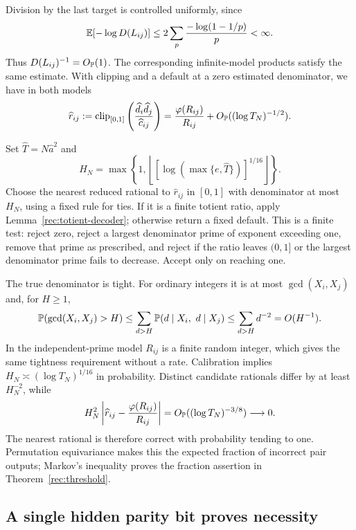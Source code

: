 Division by the last target is controlled uniformly, since
\begin{equation}\label{rec:codegree-tight}
 \mathbb E[-\log D(L_{ij})]
 \le2\sum_p\frac{-\log(1-1/p)}p<\infty.
\end{equation}
Thus $D(L_{ij})^{-1}=O_{\mathbb P}(1)$. The corresponding infinite-model
products satisfy the same estimate. With clipping and a default at a
zero estimated denominator, we have in both models
\begin{equation}\label{rec:estimated-ratio}
 \widehat r_{ij}:=
 \operatorname{clip}_{[0,1]}\left(\frac{\widehat d_i\widehat d_j}
                                    {\widehat c_{ij}}\right)
 =\frac{\varphi(R_{ij})}{R_{ij}}
   +O_{\mathbb P}((\log T_N)^{-1/2}).
\end{equation}

Set $\widehat T=N\widehat a^2$ and
\[
 H_N=\max\left\{1,\left\lfloor
       [\log(\max\{e,\widehat T\})]^{1/16}\right\rfloor\right\}.
\]
Choose the nearest reduced rational to $\widehat r_{ij}$ in $[0,1]$
with denominator at most $H_N$, using a fixed rule for ties. If it is
a finite totient ratio, apply Lemma~\ref{rec:totient-decoder}; otherwise
return a fixed default. This is a finite test: reject zero, reject a
largest denominator prime of exponent exceeding one, remove that prime
as prescribed, and reject if the ratio leaves $(0,1]$ or the largest
denominator prime fails to decrease. Accept only on reaching one.

The true denominator is tight. For ordinary integers it is at most
$\gcd(X_i,X_j)$ and, for $H\ge1$,
\begin{equation}\label{rec:gcd-tail}
 \mathbb P(\gcd(X_i,X_j)>H)
 \le\sum_{d>H}\mathbb P(d\mid X_i,\ d\mid X_j)
 \le\sum_{d>H}d^{-2}=O(H^{-1}).
\end{equation}
In the independent-prime model $R_{ij}$ is a finite random integer,
which gives the same tightness requirement without a rate.
Calibration implies $H_N\asymp(\log T_N)^{1/16}$ in probability.
Distinct candidate rationals differ by at least $H_N^{-2}$, while
\[
 H_N^2\left|\widehat r_{ij}-\frac{\varphi(R_{ij})}{R_{ij}}\right|
 =O_{\mathbb P}((\log T_N)^{-3/8})\longrightarrow0.
\]
The nearest rational is therefore correct with probability tending to
one. Permutation equivariance makes this the expected fraction of
incorrect pair outputs; Markov's inequality proves the fraction
assertion in Theorem~\ref{rec:threshold}.

\subsection{A single hidden parity bit proves necessity}

